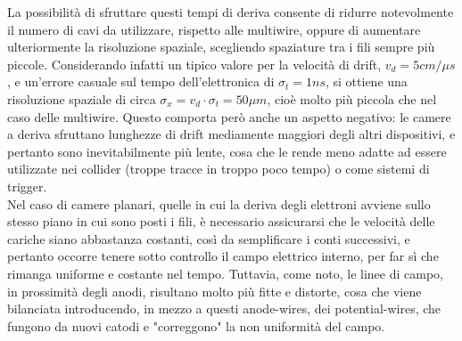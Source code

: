 \documentclass[a4paper,11pt]{book}
\begin{document}
La possibilità di sfruttare questi tempi di deriva consente di ridurre notevolmente il numero di cavi da utilizzare, rispetto alle multiwire, oppure di aumentare ulteriormente la risoluzione spaziale, scegliendo spaziature tra i fili sempre più piccole. Considerando infatti un tipico valore per la velocità di drift, $v_d = 5 cm/\mu s$, e un'errore casuale sul tempo dell'elettronica di $\sigma_t = 1ns$, si ottiene una risoluzione spaziale di circa $\sigma_x = v_d\cdot \sigma_t = 50 \mu m$, cioè molto più piccola che nel caso delle multiwire. Questo comporta però anche un aspetto negativo: le camere a deriva sfruttano lunghezze di drift mediamente maggiori degli altri dispositivi, e pertanto sono inevitabilmente più lente, cosa che le rende meno adatte ad essere utilizzate nei collider (troppe tracce in troppo poco tempo) o come sistemi di trigger.\\
Nel caso di camere planari, quelle in cui la deriva degli elettroni avviene sullo stesso piano in cui sono posti i fili, è necessario assicurarsi che le velocità delle cariche siano abbastanza costanti, così da semplificare i conti successivi, e pertanto occorre tenere sotto controllo il campo elettrico interno, per far sì che rimanga uniforme e costante nel tempo. Tuttavia, come noto, le linee di campo, in prossimità degli anodi, risultano molto più fitte e distorte, cosa che viene bilanciata introducendo, in mezzo a questi anode-wires, dei potential-wires, che fungono da nuovi catodi e "correggono" la non uniformità del campo.\\ 
\end{document}
